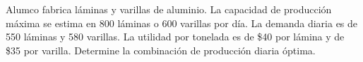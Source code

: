 \begin{frameact}{}{}
  Alumco fabrica láminas y varillas de aluminio. La capacidad de producción máxima se estima en 800 láminas o 600 varillas por día. La demanda diaria es de 550 láminas y 580 varillas. La utilidad por tonelada es de \$40 por lámina y de \$35 por varilla. Determine la
combinación de producción diaria óptima.
\end{frameact}


